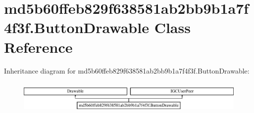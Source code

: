 \hypertarget{classmd5b60ffeb829f638581ab2bb9b1a7f4f3f_1_1ButtonDrawable}{}\section{md5b60ffeb829f638581ab2bb9b1a7f4f3f.\+Button\+Drawable Class Reference}
\label{classmd5b60ffeb829f638581ab2bb9b1a7f4f3f_1_1ButtonDrawable}
Inheritance diagram for md5b60ffeb829f638581ab2bb9b1a7f4f3f.\+Button\+Drawable\+:\begin{figure}[H]
\begin{center}
\leavevmode
\includegraphics[height=1.637427cm]{classmd5b60ffeb829f638581ab2bb9b1a7f4f3f_1_1ButtonDrawable}
\end{center}
\end{figure}
